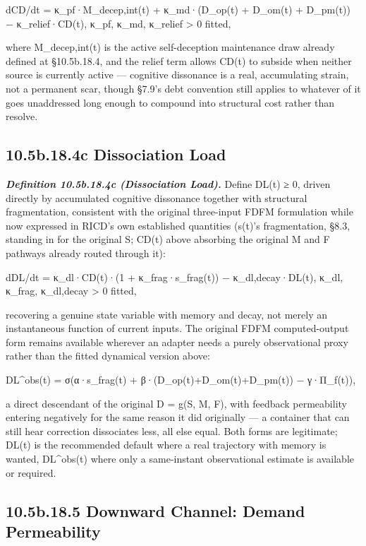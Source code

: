 \documentclass[
]{article}
\begin{document}
dCD/dt = κ\_pf·M\_decep,int(t) + κ\_md·(D\_op(t) + D\_om(t) + D\_pm(t))
− κ\_relief·CD(t), κ\_pf, κ\_md, κ\_relief \textgreater{} 0 fitted,

where M\_decep,int(t) is the active self-deception maintenance draw
already defined at §10.5b.18.4, and the relief term allows CD(t) to
subside when neither source is currently active --- cognitive dissonance
is a real, accumulating strain, not a permanent scar, though §7.9's debt
convention still applies to whatever of it goes unaddressed long enough
to compound into structural cost rather than resolve.

\hypertarget{b.18.4c-dissociation-load}{%
\subsection{10.5b.18.4c Dissociation
Load}\label{b.18.4c-dissociation-load}}

\emph{\textbf{Definition 10.5b.18.4c (Dissociation Load).}} Define DL(t)
≥ 0, driven directly by accumulated cognitive dissonance together with
structural fragmentation, consistent with the original three-input FDFM
formulation while now expressed in RICD's own established quantities
(s(t)'s fragmentation, §8.3, standing in for the original S; CD(t) above
absorbing the original M and F pathways already routed through it):

dDL/dt = κ\_dl·CD(t)·(1 + κ\_frag·s\_frag(t)) − κ\_dl,decay·DL(t),
κ\_dl, κ\_frag, κ\_dl,decay \textgreater{} 0 fitted,

recovering a genuine state variable with memory and decay, not merely an
instantaneous function of current inputs. The original FDFM
computed-output form remains available wherever an adapter needs a
purely observational proxy rather than the fitted dynamical version
above:

DL\^{}obs(t) = σ(α·s\_frag(t) + β·(D\_op(t)+D\_om(t)+D\_pm(t)) −
γ·Π\_f(t)),

a direct descendant of the original D = g(S, M, F), with feedback
permeability entering negatively for the same reason it did originally
--- a container that can still hear correction dissociates less, all
else equal. Both forms are legitimate; DL(t) is the recommended default
where a real trajectory with memory is wanted, DL\^{}obs(t) where only a
same-instant observational estimate is available or required.

\hypertarget{b.18.5-downward-channel-demand-permeability}{%
\subsection{10.5b.18.5 Downward Channel: Demand
Permeability}\label{b.18.5-downward-channel-demand-permeability}}
\end{document}
